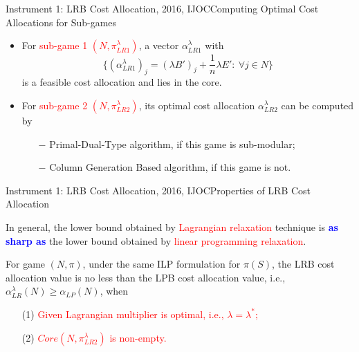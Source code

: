 \documentclass[14pt]{beamer}
\begin{document}
\begin{frame}{Instrument 1: LRB Cost Allocation, {\footnotesize 2016, IJOC}}{Computing Optimal Cost Allocations for Sub-games}
\footnotesize
\vspace{-2mm}
\begin{itemize}
\item For \textcolor{red}{sub-game 1 $(N,\pi_{LR1}^{\lambda})$}, a vector $\alpha_{LR1}^{\lambda}$ with
\begin{equation*}
\{(\alpha_{LR1}^{\lambda})_j = (\lambda B')_j + \frac{1}{n}\lambda E':~\forall j \in N \}
\end{equation*}
is a feasible cost allocation and lies in the core.

\vspace{3mm}
\item For \textcolor{red}{sub-game 2 $(N,\pi_{LR2}^{\lambda})$}, its optimal cost allocation $\alpha_{LR2}^{\lambda}$ can be computed by
\begin{itemize}
\footnotesize
\item[$-$] Primal-Dual-Type algorithm, if this game is sub-modular;\\
\vspace{2mm}
\item[$-$] Column Generation Based algorithm, if this game is not.
\end{itemize}
\end{itemize}

\end{frame}


\begin{frame}{Instrument 1: LRB Cost Allocation, {\footnotesize 2016, IJOC}}{Properties of LRB Cost Allocation}
\small
\vspace{-0.5cm}
\begin{shaded}
\centering
In general, the lower bound obtained by \textcolor{red}{Lagrangian relaxation} technique is \textcolor{blue}{\bf as sharp as} the lower bound obtained by \textcolor{red}{linear programming relaxation}.
\end{shaded}
\vspace{-0.1cm}
\begin{theorem}\label{thm:lagcostallocation1}
\rm
For game $(N,\pi)$, under the same ILP formulation for $\pi(S)$, the LRB cost allocation value is no less than the LPB cost allocation value, i.e., $\alpha_{LR}^{\lambda}(N) \geq \alpha_{LP}(N)$, when
\begin{itemize}
\item[(1)] \textcolor{red}{Given Lagrangian multiplier is optimal, i.e., $\lambda = \lambda^*$;}
\item[(2)] \textcolor{red}{$Core(N,\pi_{LR2}^{\lambda})$ is non-empty.}
\end{itemize}
\end{theorem}
\end{frame}
\end{document}
